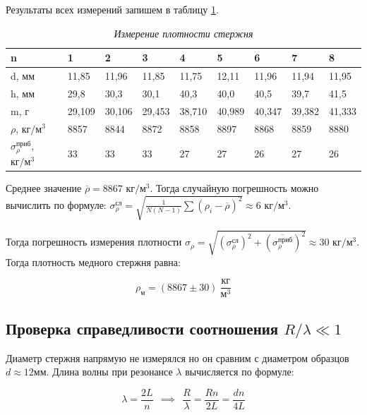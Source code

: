 \documentclass[a4paper,12pt]{article}
\begin{document}
Результаты всех измерений запишем в таблицу \ref{density}.

\begin{table}[!ht]
    \centering
    \begin{tabular}{|l|l|l|l|l|l|l|l|l|}
    \hline
        n & 1 & 2 & 3 & 4 & 5 & 6 & 7 & 8 \\ \hline
        d, мм & 11,85 & 11,96 & 11,85 & 11,75 & 12,11 & 11,96 & 11,94 & 11,95 \\ \hline
        h, мм & 29,8 & 30,3 & 30,1 & 40,3 & 40,0 & 40,5 & 39,7 & 41,5 \\ \hline
        m, г & 29,109 & 30,106 & 29,453 & 38,710 & 40,989 & 40,347 & 39,382 & 41,333 \\ \hline
        $\rho$, $\text{кг}/\text{м}^3$ & 8857 & 8844 & 8872 & 8858 & 8897 & 8868 & 8859 & 8880 \\ \hline
        $\sigma_\rho^\text{приб}$, $\text{кг}/\text{м}^3$ & 33 & 33 & 33 & 27 & 27 & 26 & 27 & 26 \\ \hline
    \end{tabular}\caption{\textit{Измерение плотности стержня}}\label{density}
\end{table}

Среднее значение $\overline{\rho} = 8867$ $\text{кг}/\text{м}^3$. Тогда случайную погрешность можно вычислить по формуле: $ \sigma_\rho^\text{сл} = \sqrt{\frac{1}{N  (N-1)}\sum(\rho_i-\overline{\rho})^2} \approx 6 \text{ кг}/\text{м}^3$.

Тогда погрешность измерения плотности $\sigma_\rho = \sqrt{(\sigma_\rho^\text{сл})^2 + (\overline{\sigma_\rho^\text{приб}})^2} \approx 30 \text{ кг}/\text{м}^3 $. Тогда плотность медного стержня равна:

\begin{equation}
    \rho_\text{м} = (8867 \pm 30) \ \frac{\text{кг}}{\text{м}^3}
\end{equation}

\subsection{Проверка справедливости соотношения $R/\lambda \ll 1$}
\label{expirement-ten}

Диаметр стержня напрямую не измерялся но он сравним с диаметром образцов $d \approx 12 \text{мм}$. Длина волны при резонансе $\lambda$ вычисляется по формуле:

\begin{equation}
    \lambda = \frac{2 L}{n} \ \ \implies \ \ \frac{R}{\lambda} = \frac{R n}{2 L} = \frac{d n}{4 L} 
\end{equation}
\end{document}
